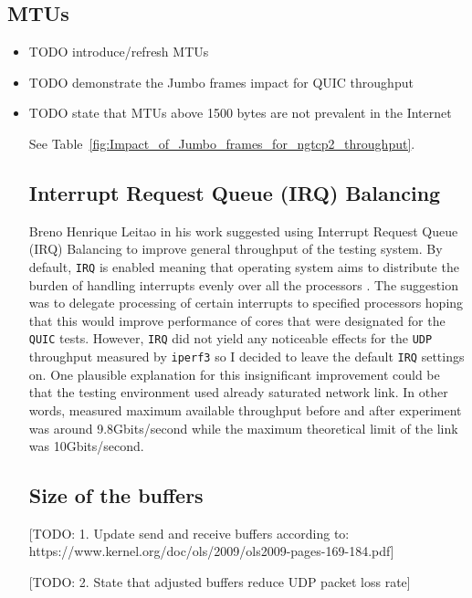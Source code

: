 \documentclass[12pt,a4paper,twoside,openright]{report}
\begin{document}
\subsection{MTUs}
\begin{itemize}
  \item TODO introduce/refresh MTUs
  \item TODO demonstrate the Jumbo frames impact for QUIC throughput
  \item TODO state that MTUs above 1500 bytes are not prevalent in the Internet
  
  
  See Table~\ref{fig:Impact_of_Jumbo_frames_for_ngtcp2_throughput}.
  
  
\subsection{Interrupt Request Queue (IRQ) Balancing} 
Breno Henrique Leitao in his work suggested using \cite{Tuning_10Gb_network_cards_on_Linux} Interrupt Request Queue (IRQ) Balancing to improve general throughput of the testing system.
By default, \texttt{IRQ} is enabled meaning that operating system aims to distribute the burden of handling interrupts evenly over all the processors \cite{Tuning_10Gb_network_cards_on_Linux}.
The suggestion was to delegate processing of certain interrupts to specified processors hoping that this would improve performance of cores that were designated for the \texttt{QUIC} tests.
However, \texttt{IRQ} did not yield any noticeable effects for the \texttt{UDP} throughput measured by \texttt{iperf3} so I decided to leave the default \texttt{IRQ} settings on.
One plausible explanation for this insignificant improvement could be that the testing environment used already saturated network link.
In other words, measured maximum available throughput before and after experiment was around 9.8Gbits/second while the maximum theoretical limit of the link was 10Gbits/second. 


\subsection{Size of the buffers} 

[TODO: 1. Update send and receive buffers according to: https://www.kernel.org/doc/ols/2009/ols2009-pages-169-184.pdf]  

[TODO: 2. State that adjusted buffers reduce UDP packet loss rate] 
 
 
  
\begin{table}[ht]


\end{table}
\end{itemize}
\end{document}
